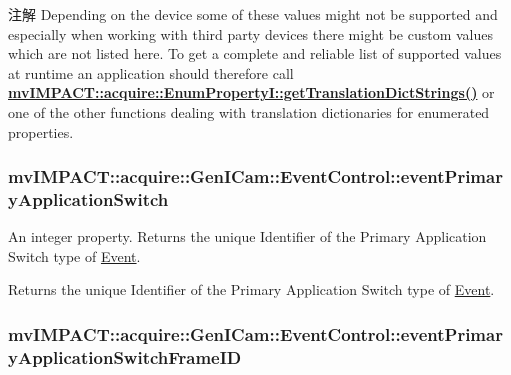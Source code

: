 \begin{DoxyNote}{注解}
Depending on the device some of these values might not be supported and especially when working with third party devices there might be custom values which are not listed here. To get a complete and reliable list of supported values at runtime an application should therefore call {\bfseries \hyperlink{classmv_i_m_p_a_c_t_1_1acquire_1_1_enum_property_i_a0ba6ccbf5ee69784d5d0b537924d26b6}{mv\+I\+M\+P\+A\+C\+T\+::acquire\+::\+Enum\+Property\+I\+::get\+Translation\+Dict\+Strings()}} or one of the other functions dealing with translation dictionaries for enumerated properties. 
\end{DoxyNote}
\hypertarget{classmv_i_m_p_a_c_t_1_1acquire_1_1_gen_i_cam_1_1_event_control_a6aa61c60c5f9a05f9156939cc938f40b}{
\subsubsection[{event\+Primary\+Application\+Switch}]{ mv\+I\+M\+P\+A\+C\+T\+::acquire\+::\+Gen\+I\+Cam\+::\+Event\+Control\+::event\+Primary\+Application\+Switch}}\label{classmv_i_m_p_a_c_t_1_1acquire_1_1_gen_i_cam_1_1_event_control_a6aa61c60c5f9a05f9156939cc938f40b}


An integer property. Returns the unique Identifier of the Primary Application Switch type of \hyperlink{classmv_i_m_p_a_c_t_1_1acquire_1_1_event}{Event}. 

Returns the unique Identifier of the Primary Application Switch type of \hyperlink{classmv_i_m_p_a_c_t_1_1acquire_1_1_event}{Event}. \hypertarget{classmv_i_m_p_a_c_t_1_1acquire_1_1_gen_i_cam_1_1_event_control_ab415e09e47659526aa05a3f41e80bf1d}{
\subsubsection[{event\+Primary\+Application\+Switch\+Frame\+I\+D}]{ mv\+I\+M\+P\+A\+C\+T\+::acquire\+::\+Gen\+I\+Cam\+::\+Event\+Control\+::event\+Primary\+Application\+Switch\+Frame\+I\+D}}\label{classmv_i_m_p_a_c_t_1_1acquire_1_1_gen_i_cam_1_1_event_control_ab415e09e47659526aa05a3f41e80bf1d}


